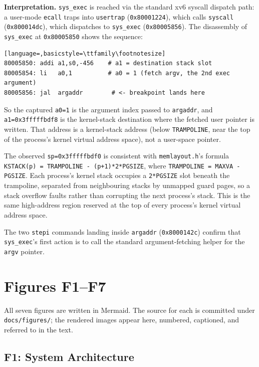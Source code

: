 \documentclass[11pt,a4paper]{article}
\begin{document}
\textbf{Interpretation.} \texttt{sys\_exec} is reached via the standard xv6 syscall dispatch path: a user-mode \texttt{ecall} traps into \texttt{usertrap} (\texttt{0x80001224}), which calls \texttt{syscall} (\texttt{0x800014dc}), which dispatches to \texttt{sys\_exec} (\texttt{0x80005856}). The disassembly of \texttt{sys\_exec} at \texttt{0x80005850} shows the sequence:

\begin{lstlisting}[language=,basicstyle=\ttfamily\footnotesize]
80005850: addi a1,s0,-456    # a1 = destination stack slot
80005854: li   a0,1          # a0 = 1 (fetch argv, the 2nd exec argument)
80005856: jal  argaddr        # <- breakpoint lands here
\end{lstlisting}

So the captured \texttt{a0=1} is the argument index passed to \texttt{argaddr}, and \texttt{a1=0x3fffffbdf8} is the kernel-stack destination where the fetched user pointer is written. That address is a kernel-stack address (below \texttt{TRAMPOLINE}, near the top of the process's kernel virtual address space), not a user-space pointer.

The observed \texttt{sp=0x3fffffbdf0} is consistent with \texttt{memlayout.h}'s formula \texttt{KSTACK(p) = TRAMPOLINE - (p+1)*2*PGSIZE}, where \texttt{TRAMPOLINE = MAXVA - PGSIZE}. Each process's kernel stack occupies a \texttt{2*PGSIZE} slot beneath the trampoline, separated from neighbouring stacks by unmapped guard pages, so a stack overflow faults rather than corrupting the next process's stack. This is the same high-address region reserved at the top of every process's kernel virtual address space.

The two \texttt{stepi} commands landing inside \texttt{argaddr} (\texttt{0x8000142c}) confirm that \texttt{sys\_exec}'s first action is to call the standard argument-fetching helper for the \texttt{argv} pointer.

\section{Figures F1--F7}

All seven figures are written in Mermaid. The source for each is committed under \texttt{docs/figures/}; the rendered images appear here, numbered, captioned, and referred to in the text.

\subsection{F1: System Architecture}
\end{document}
